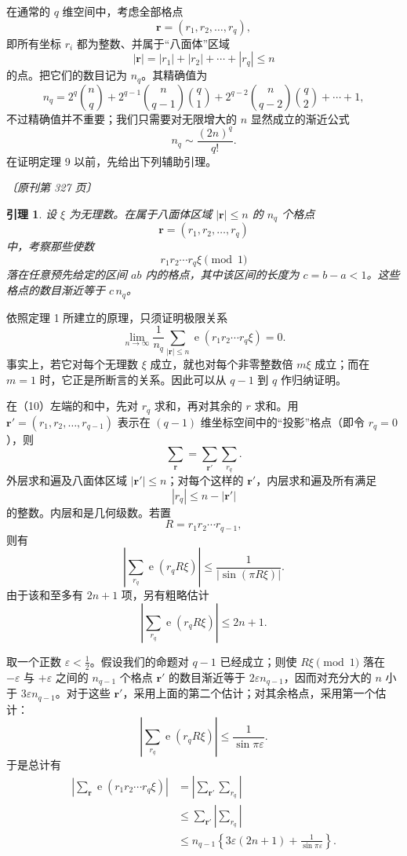 \documentclass[UTF8,11pt,a4paper,fontset=none]{ctexart}
\theoremstyle{weylthm}
\newtheorem*{lemma*}{引理}
\newcommand{\e}{\operatorname{e}}
\newcommand{\origpage}[1]{%
  \par\vspace{0.7em}\noindent\hfill{\small\itshape〔原刊第 #1 页〕}\par\vspace{0.25em}}
\begin{document}
在通常的 \(q\) 维空间中，考虑全部格点
\[
 \mathbf r=(r_1,r_2,\ldots,r_q),
\]
即所有坐标 \(r_i\) 都为整数、并属于“八面体”区域
\[
 |\mathbf r|=|r_1|+|r_2|+\cdots+|r_q|\leq n
\]
的点。把它们的数目记为 \(n_q\)。其精确值为
\[
 n_q
 =2^q\binom{n}{q}
 +2^{q-1}\binom{n}{q-1}\binom{q}{1}
 +2^{q-2}\binom{n}{q-2}\binom{q}{2}
 +\cdots+1,
\]
不过精确值并不重要；我们只需要对无限增大的 \(n\) 显然成立的渐近公式
\[
 n_q\sim\frac{(2n)^q}{q!}.
\]
在证明定理 9 以前，先给出下列辅助引理。

\origpage{327}

\begin{lemma*}
设 \(\xi\) 为无理数。在属于八面体区域 \(|\mathbf r|\leq n\) 的 \(n_q\) 个格点
\[
 \mathbf r=(r_1,r_2,\ldots,r_q)
\]
中，考察那些使数
\[
 r_1r_2\cdots r_q\xi\pmod 1
\]
落在任意预先给定的区间 \(ab\) 内的格点，其中该区间的长度为
\(c=b-a<1\)。这些格点的数目渐近等于 \(c\,n_q\)。
\end{lemma*}

依照定理 1 所建立的原理，只须证明极限关系
\begin{equation}
 \lim_{n\to\infty}\frac1{n_q}
 \sum_{|\mathbf r|\leq n}
 \e(r_1r_2\cdots r_q\xi)=0.
 \tag{10}
\end{equation}
事实上，若它对每个无理数 \(\xi\) 成立，就也对每个非零整数倍
\(m\xi\) 成立；而在 \(m=1\) 时，它正是所断言的关系。因此可以从
\(q-1\) 到 \(q\) 作归纳证明。

在（10）左端的和中，先对 \(r_q\) 求和，再对其余的 \(r\) 求和。用
\(\mathbf r'=(r_1,r_2,\ldots,r_{q-1})\) 表示在 \((q-1)\) 维坐标空间中的“投影”格点（即令 \(r_q=0\)），则
\[
 \sum_{\mathbf r}=\sum_{\mathbf r'}\sum_{r_q}.
\]
外层求和遍及八面体区域 \(|\mathbf r'|\leq n\)；对每个这样的
\(\mathbf r'\)，内层求和遍及所有满足
\[
 |r_q|\leq n-|\mathbf r'|
\]
的整数。内层和是几何级数。若置
\[
 R=r_1r_2\cdots r_{q-1},
\]
则有
\[
 \left|\sum_{r_q}\e(r_qR\xi)\right|
 \leq\frac1{|\sin(\pi R\xi)|}.
\]
由于该和至多有 \(2n+1\) 项，另有粗略估计
\[
 \left|\sum_{r_q}\e(r_qR\xi)\right|\leq 2n+1.
\]

取一个正数 \(\varepsilon<\tfrac12\)。假设我们的命题对 \(q-1\) 已经成立；则使
\(R\xi\pmod 1\) 落在 \(-\varepsilon\) 与 \(+\varepsilon\) 之间的
\(n_{q-1}\) 个格点 \(\mathbf r'\) 的数目渐近等于
\(2\varepsilon n_{q-1}\)，因而对充分大的 \(n\) 小于
\(3\varepsilon n_{q-1}\)。对于这些 \(\mathbf r'\)，采用上面的第二个估计；对其余格点，采用第一个估计：
\[
 \left|\sum_{r_q}\e(r_qR\xi)\right|
 \leq\frac1{\sin\pi\varepsilon}.
\]
于是总计有
\[
\begin{aligned}
 \left|\sum_{\mathbf r}\e(r_1r_2\cdots r_q\xi)\right|
 &=\left|\sum_{\mathbf r'}\sum_{r_q}\right|\\
 &\leq\sum_{\mathbf r'}\left|\sum_{r_q}\right|\\
 &\leq n_{q-1}
 \left\{3\varepsilon(2n+1)+\frac1{\sin\pi\varepsilon}\right\}.
\end{aligned}
\]
\end{document}
